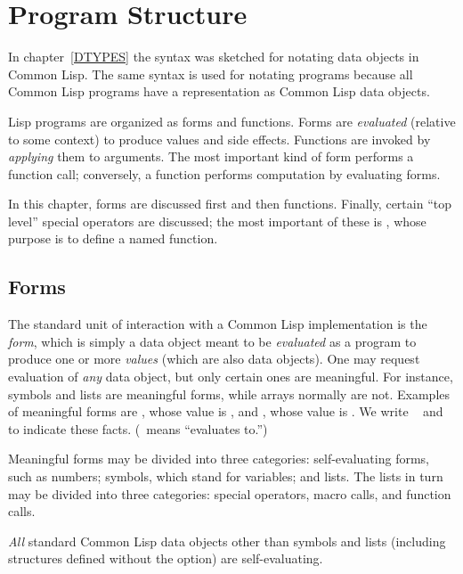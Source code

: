 
\clearpage\def\pagestatus{FINAL PROOF}

\ifx \rulang\Undef
\chapter{Program Structure}
\label{PROGS}

In chapter~\ref{DTYPES} the syntax was sketched for notating data objects
in Common Lisp.  The same syntax is used for notating programs because all
Common Lisp programs have a representation as Common Lisp data objects.

Lisp programs are organized as forms and functions.  Forms are
\emph{evaluated} (relative to some context) to produce values and side
effects.  Functions are invoked by \emph{applying} them to arguments.
The most important kind of form performs a function call;
conversely, a function performs computation by evaluating forms.

In this chapter, forms are discussed first and then functions.
Finally, certain ``top level'' special operators are discussed; the most
important of these is , whose purpose is to define a
named function.

\section{Forms}

The standard unit of interaction with a Common Lisp implementation is the \emph{form},
which is simply a data object meant to be \emph{evaluated} as a program
to produce one or more \emph{values} (which are also data objects).
One may request evaluation of \emph{any} data object, but only certain ones
are meaningful.  For instance,
symbols and lists are meaningful forms, while arrays
normally are not.  Examples of meaningful forms are ,
whose value is , and , whose value is .
We write  \EV\  and  \EV\ 
to indicate these facts.  (\EV\ means ``evaluates to.'')

Meaningful forms may be divided into three categories:
self-evaluating forms, such as numbers; symbols, which stand
for variables; and lists.  The lists in turn may be divided
into three categories: special operators, macro calls, and function calls.

\emph{All} standard Common Lisp data objects other than symbols
and lists (including  structures defined
without the  option) are self-evaluating.

